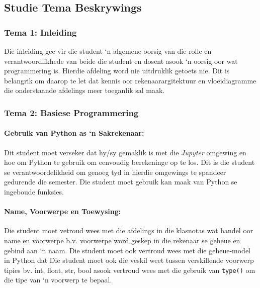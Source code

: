     \subsection{Studie Tema Beskrywings}
        \subsubsection{Tema 1: Inleiding}
            Die inleiding gee vir die student `n algemene oorsig van die rolle
            en verantwoordlikhede van beide die student en dosent asook `n
            oorsig oor wat programmering is.  Hierdie afdeling word nie
            uitdruklik getoets nie.  Dit is belangrik om daarop te let dat
            kennis oor rekenaarargitektuur en vloeidiagramme die onderstaande
            afdelings meer toeganlik sal maak.

        \subsubsection{Tema 2: Basiese Programmering}
            \paragraph{Gebruik van Python as `n Sakrekenaar:}
                Dit student moet verseker dat hy/sy gemaklik is met die
                \emph{Jupyter} omgewing en hoe om Python te gebruik om
                eenvoudig berekeninge op te los. Dit is die student se
                verantwoordelikheid om genoeg tyd in hierdie omgewings te
                spandeer gedurende die semester.  Die student moet gebruik kan
                maak van Python se ingeboude funksies.

            \paragraph{Name, Voorwerpe en Toewysing:}
                Die student moet vetroud wees met die afdelings in die
                klasnotas wat handel oor name en voorwerpe b.v. voorwerpe word
                geskep in die rekenaar se geheue en gebind aan `n naam.  Die
                student moet ook vertroud wees met die geheue-model in Python
                dat Die student moet ook die veskil weet tussen verskillende
                voorwerp tipies bv. int, float, str, bool asook vertroud wees
                met die gebruik van \texttt{type()} om die tipe van `n voorwerp
                te bepaal.

